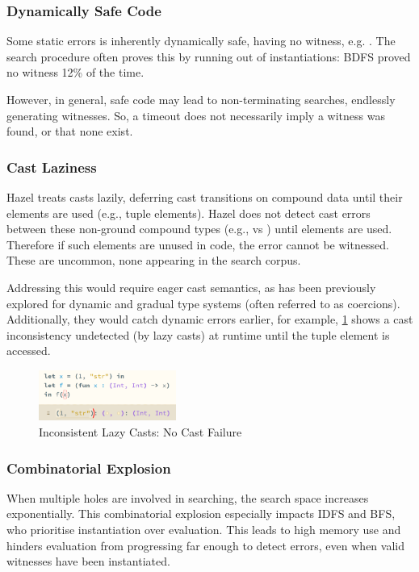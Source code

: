 \subsubsection{Dynamically Safe Code}
Some static errors is inherently dynamically safe, having no witness, e.g. . The search procedure often proves this by running out of instantiations: BDFS proved no witness 12\% of the time. 

However, in general, safe code may lead to non-terminating searches, endlessly generating witnesses. So, a timeout does not necessarily imply a witness was found, or that none exist.

\subsubsection{Cast Laziness}\label{sec:EvalCastLaziness}
Hazel treats casts lazily, deferring cast transitions on compound data until their elements are used (e.g., tuple elements). Hazel does not detect cast errors between these non-ground compound types (e.g., \code{[Int]} vs \code{[String]}) until elements are used. Therefore if such elements are unused in code, the error cannot be witnessed. These are uncommon, none appearing in the search corpus.

Addressing this would require eager cast semantics, as has been previously explored for dynamic and gradual type systems \cite{EagerCasts, GradualEagerCasts} (often referred to as coercions). Additionally, they would catch dynamic errors earlier, for example, \cref{fig:LazyCastError} shows a cast inconsistency undetected (by lazy casts) at runtime until the tuple element is accessed.
\begin{figure}[h]
\centering
\includegraphics[width=0.4\textwidth]{Media/Figures/cast_laziness_no_error}
\caption{Inconsistent Lazy Casts: No Cast Failure}
\label{fig:LazyCastError}
\end{figure}

\subsubsection{Combinatorial Explosion}
When multiple holes are involved in searching, the search space increases exponentially. This combinatorial explosion especially impacts IDFS and BFS, who prioritise instantiation over evaluation. This leads to high memory use and hinders evaluation from progressing far enough to detect errors, even when valid witnesses have been instantiated.

